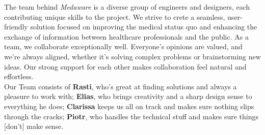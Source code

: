 \vspace*{\fill}
The team behind \textit{Medaware} is a diverse group of engineers and designers, each contributing unique skills to the project.
We strive to crete a seamless, user-friendly solution focused on improving the medical status quo and enhancing the exchange of
information between healthcare professionals and the public. As a team, we collaborate exceptionally well. Everyone's
opinions are valued, and we're always aligned, whether it's solving complex problems or brainstorming new ideas.
Our strong support for each other makes collaboration feel natural and effortless.\\[2\baselineskip]
Our Team consists of
\textbf{Rasti}, who's great at finding solutions and always a pleasure to work with;
\textbf{Elias}, who brings creativity and a sharp design sense to everything he does;
\textbf{Clarissa} keeps us all on track and makes sure nothing slips through the cracks;
\textbf{Piotr}, who handles the technical stuff and makes sure things [don't] make sense. \\[\baselineskip]
\vspace*{\fill}
